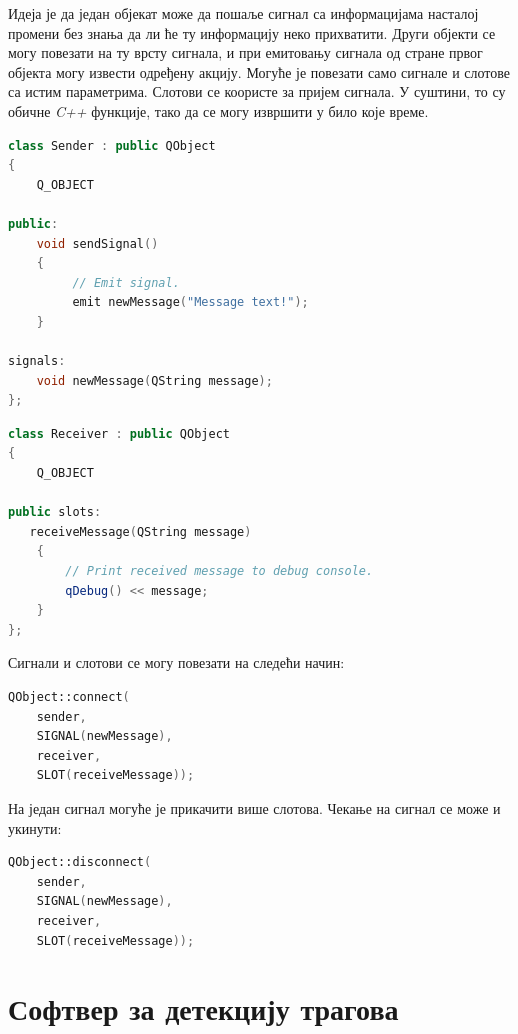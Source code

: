 \documentclass[11pt,a4paper,serbian,oneside]{book}
\begin{document}
Идеја је да један објекат може да пошаље сигнал са информацијама насталој промени без знања да ли ће ту информацију неко прихватити. Други објекти се могу повезати на ту врсту сигнала, и при емитовању сигнала од стране првог објекта могу извести одређену акцију. Могуће је повезати само сигнале и слотове са истим параметрима. Слотови се коористе за пријем сигнала. У суштини, то су обичне \textit{C++} функције, тако да се могу извршити у било које време.

\begin{lstlisting}[language=C++,label=lst:signal_and_slot,caption=Дефиниција и емитовање сигнала]
class Sender : public QObject
{
    Q_OBJECT

public:
    void sendSignal()
    {
         // Emit signal.
         emit newMessage("Message text!");
    }

signals:
    void newMessage(QString message);
};
\end{lstlisting}

\begin{lstlisting}[language=C++,label=lst:signal_and_slot,caption=Дефиниција слота]
class Receiver : public QObject
{
    Q_OBJECT

public slots:
   receiveMessage(QString message)
    {
        // Print received message to debug console.
        qDebug() << message;
    }
};
\end{lstlisting}

Сигнали и слотови се могу повезати на следећи начин:

\begin{lstlisting}[language=C++,label=lst:signal_and_slot,caption=Повезивање сигнала и слотова]
QObject::connect(
    sender,
    SIGNAL(newMessage),
    receiver,
    SLOT(receiveMessage));
\end{lstlisting}

На један сигнал могуће је прикачити више слотова. Чекање на сигнал се може и укинути:

\begin{lstlisting}[language=C++,label=lst:signal_and_slot,caption=Укидање везе сигнала и слота]
QObject::disconnect(
    sender,
    SIGNAL(newMessage),
    receiver,
    SLOT(receiveMessage));
\end{lstlisting}

%
%
%

\chapter{Софтвер за детекцију трагова}
\end{document}
